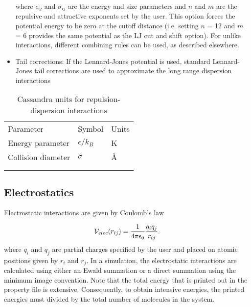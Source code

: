 \begin{itemize}
where $\epsilon_{ij}$ and $\sigma_{ij}$ are the energy and size
parameters and $n$ and $m$ are the repulsive and attractive exponents set by the user. This
option forces the potential energy to be zero at the cutoff
distance (i.e. setting $n$ = 12 and $m$ = 6 provides the same potential as the LJ cut and shift option). For unlike interactions, different 
combining rules can be used, as described elsewhere.


\item Tail corrections: If the Lennard-Jones potential is used, standard Lennard-Jones tail corrections are used to approximate the long range dispersion interactions

\end{itemize}

\begin{center}
\begin{table}[h]
	\begin{center}
	\caption{Cassandra units for repulsion-dispersion interactions}
	\begin{tabular} {l l l} \\ \hline \hline
	 Parameter & Symbol &  Units \\
	Energy parameter 	& $\epsilon/k_B$ & K \\
	Collision diameter &	 $\sigma$ & \AA \\ \\ \hline \\
	\end{tabular}
	\end{center}
	\label{Tab:LJ_Units}
\end{table}
\end{center}

\subsection{Electrostatics}\label{Sec:qq}

Electrostatic interactions are given by  Coulomb's law

\begin{equation}
{\cal V}_{elec} (r_{ij}) = \frac{1}{4\pi\epsilon_0} \frac {q_i q_j} {r_{ij}}.
\label{Eq:Coulomb}
\end{equation}
where $q_i$ and $q_j$ are partial charges specified by the user and
placed on atomic positions given by $r_i$ and $r_j$. In a simulation,
the electrostatic interactions are calculated using either an Ewald
summation or a direct summation using the minimum image convention. Note that 
the total energy that is printed out in the property file is extensive. 
Consequently, to obtain intensive energies, the printed energies must divided by 
the total number of molecules in the system. 

